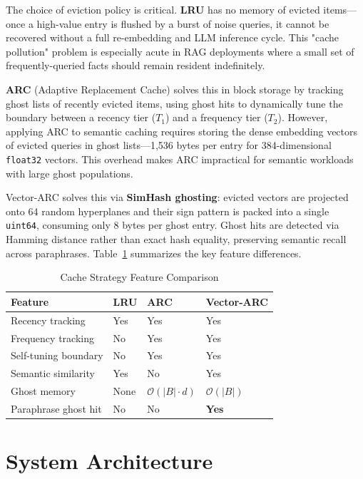 \documentclass[conference,10pt]{IEEEtran}
\begin{document}
The choice of eviction policy is critical. \textbf{LRU} has no memory of evicted items—once a high-value entry is flushed by a burst of noise queries, it cannot be recovered without a full re-embedding and LLM inference cycle. This "cache pollution" problem is especially acute in RAG deployments where a small set of frequently-queried facts should remain resident indefinitely.

\textbf{ARC} (Adaptive Replacement Cache) solves this in block storage by tracking ghost lists of recently evicted items, using ghost hits to dynamically tune the boundary between a recency tier ($T_1$) and a frequency tier ($T_2$). However, applying ARC to semantic caching requires storing the dense embedding vectors of evicted queries in ghost lists—1,536 bytes per entry for 384-dimensional \texttt{float32} vectors. This overhead makes ARC impractical for semantic workloads with large ghost populations.

Vector-ARC solves this via \textbf{SimHash ghosting}: evicted vectors are projected onto 64 random hyperplanes and their sign pattern is packed into a single \texttt{uint64}, consuming only 8 bytes per ghost entry. Ghost hits are detected via Hamming distance rather than exact hash equality, preserving semantic recall across paraphrases. Table~\ref{tab:comparison} summarizes the key feature differences.

\begin{table}[htbp]
\centering
\caption{Cache Strategy Feature Comparison}
\label{tab:comparison}
\begin{tabularx}{\columnwidth}{@{}lXXX@{}}
\toprule
\textbf{Feature} & \textbf{LRU} & \textbf{ARC} & \textbf{Vector-ARC} \\ \midrule
Recency tracking       & Yes & Yes & Yes \\
Frequency tracking     & No  & Yes & Yes \\
Self-tuning boundary   & No  & Yes & Yes \\
Semantic similarity    & Yes & No  & Yes \\
Ghost memory           & None & $\mathcal{O}(|B| \cdot d)$ & $\mathcal{O}(|B|)$ \\
Paraphrase ghost hit   & No  & No  & \textbf{Yes} \\
\bottomrule
\end{tabularx}
\end{table}

\section{System Architecture}
\end{document}
